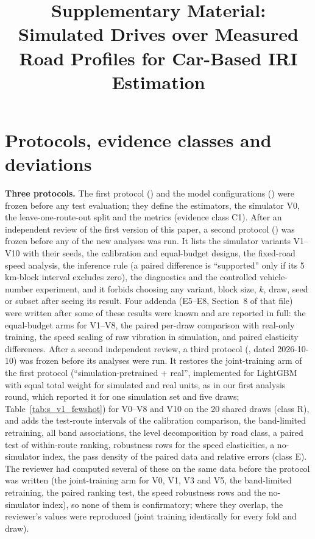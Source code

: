 \documentclass[onecolumn,10pt]{IEEEtran}
\begin{document}
\title{Supplementary Material:\\ Simulated Drives over Measured Road Profiles for Car-Based IRI Estimation}
\maketitle

\section{Protocols, evidence classes and deviations}
\label{sec:s_protocol}
\textbf{Three protocols.}
The first protocol () and the model configurations () were frozen before any test evaluation; they define the estimators, the simulator V0, the leave-one-route-out split and the metrics (evidence class C1).
After an independent review of the first version of this paper, a second protocol () was frozen before any of the new analyses was run.
It lists the simulator variants V1--V10 with their seeds, the calibration and equal-budget designs, the fixed-road speed analysis, the inference rule (a paired difference is ``supported'' only if its 5\,km-block interval excludes zero), the diagnostics and the controlled vehicle-number experiment, and it forbids choosing any variant, block size, $k$, draw, seed or subset after seeing its result.
Four addenda (E5--E8, Section~8 of that file) were written after some of these results were known and are reported in full: the equal-budget arms for V1--V8, the paired per-draw comparison with real-only training, the speed scaling of raw vibration in simulation, and paired elasticity differences.
After a second independent review, a third protocol (, dated 2026-10-10) was frozen before its analyses were run.
It restores the joint-training arm of the first protocol (``simulation-pretrained + real'', implemented for LightGBM with equal total weight for simulated and real units, as in our first analysis round, which reported it for one simulation set and five draws; Table~\ref{tab:s_v1_fewshot}) for V0--V8 and V10 on the 20 shared draws (class R), and adds the test-route intervals of the calibration comparison, the band-limited retraining, all band associations, the level decomposition by road class, a paired test of within-route ranking, robustness rows for the speed elasticities, a no-simulator index, the pass density of the paired data and relative errors (class E).
The reviewer had computed several of these on the same data before the protocol was written (the joint-training arm for V0, V1, V3 and V5, the band-limited retraining, the paired ranking test, the speed robustness rows and the no-simulator index), so none of them is confirmatory; where they overlap, the reviewer's values were reproduced (joint training identically for every fold and draw).
\end{document}

